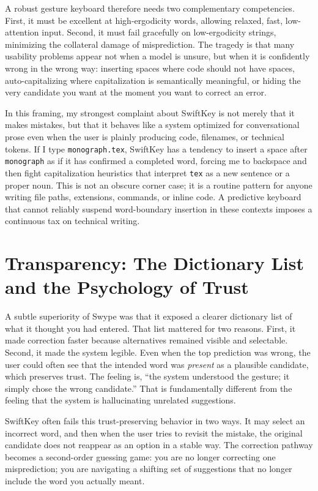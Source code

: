 \documentclass[11pt]{article}
\begin{document}
A robust gesture keyboard therefore needs two complementary competencies. First, it must be excellent at high-ergodicity words, allowing relaxed, fast, low-attention input. Second, it must fail gracefully on low-ergodicity strings, minimizing the collateral damage of misprediction. The tragedy is that many usability problems appear not when a model is unsure, but when it is confidently wrong in the wrong way: inserting spaces where code should not have spaces, auto-capitalizing where capitalization is semantically meaningful, or hiding the very candidate you want at the moment you want to correct an error.

In this framing, my strongest complaint about SwiftKey is not merely that it makes mistakes, but that it behaves like a system optimized for conversational prose even when the user is plainly producing code, filenames, or technical tokens. If I type \texttt{monograph.tex}, SwiftKey has a tendency to insert a space after \texttt{monograph} as if it has confirmed a completed word, forcing me to backspace and then fight capitalization heuristics that interpret \texttt{tex} as a new sentence or a proper noun. This is not an obscure corner case; it is a routine pattern for anyone writing file paths, extensions, commands, or inline code. A predictive keyboard that cannot reliably suspend word-boundary insertion in these contexts imposes a continuous tax on technical writing.

\section{Transparency: The Dictionary List and the Psychology of Trust}

A subtle superiority of Swype was that it exposed a clearer dictionary list of what it thought you had entered. That list mattered for two reasons. First, it made correction faster because alternatives remained visible and selectable. Second, it made the system legible. Even when the top prediction was wrong, the user could often see that the intended word was \emph{present} as a plausible candidate, which preserves trust. The feeling is, ``the system understood the gesture; it simply chose the wrong candidate.'' That is fundamentally different from the feeling that the system is hallucinating unrelated suggestions.

SwiftKey often fails this trust-preserving behavior in two ways. It may select an incorrect word, and then when the user tries to revisit the mistake, the original candidate does not reappear as an option in a stable way. The correction pathway becomes a second-order guessing game: you are no longer correcting one misprediction; you are navigating a shifting set of suggestions that no longer include the word you actually meant.
\end{document}
